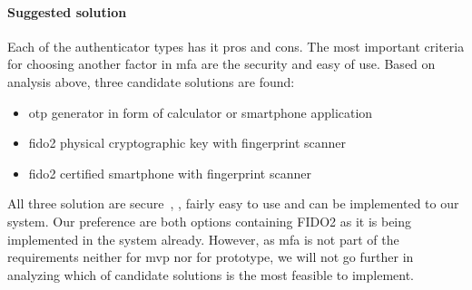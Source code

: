 \paragraph{Suggested solution}
Each of the authenticator types has it pros and cons. The most important criteria for choosing another factor in \acrshort{mfa} are the security and easy of use. Based on analysis above, three candidate solutions are found:
\begin{itemize}[noitemsep]
    \item \acrshort{otp} generator in form of calculator or smartphone application
    \item \acrshort{fido}2 physical cryptographic key with fingerprint scanner
    \item \acrshort{fido}2 certified smartphone with fingerprint scanner
\end{itemize}
All three solution are secure~\cite{Grassi2017DigitalManagement}, \cite{FIDOFIDO2Project}, fairly easy to use and can be implemented to our system. Our preference are both options containing FIDO2 as it is being implemented in the system already. However, as \acrshort{mfa} is not part of the requirements neither for \acrshort{mvp} nor for prototype, we will not go further in analyzing which of candidate solutions is the most feasible to implement.